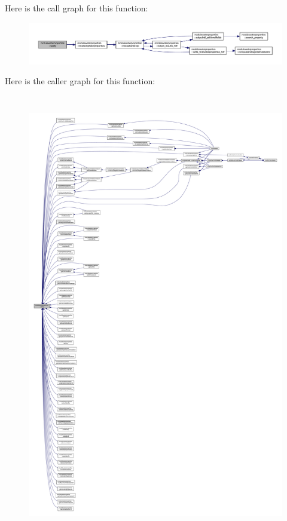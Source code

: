 Here is the call graph for this function\+:\nopagebreak
\begin{figure}[H]
\begin{center}
\leavevmode
\includegraphics[width=350pt]{namespacemodulewaterproperties_ad54774dedce486739249cb10b4de21e2_cgraph}
\end{center}
\end{figure}
Here is the caller graph for this function\+:\nopagebreak
\begin{figure}[H]
\begin{center}
\leavevmode
\includegraphics[height=550pt]{namespacemodulewaterproperties_ad54774dedce486739249cb10b4de21e2_icgraph}
\end{center}
\end{figure}
\mbox{\label{namespacemodulewaterproperties_ae6984c00ccf20f1bc66a14e9e9466c38}} 
